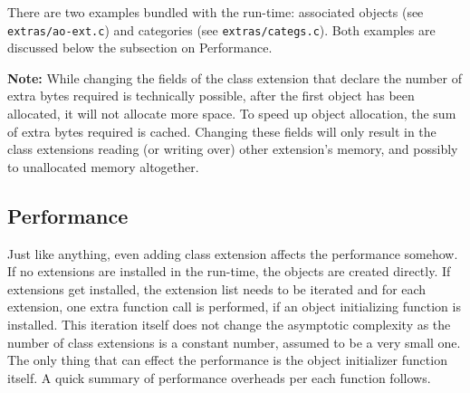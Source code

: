 There are two examples bundled with the run-time: associated objects (see \verb=extras/ao-ext.c=) and categories (see \texttt{extras/categs.c}). Both examples are discussed below the subsection on Performance.

\textbf{Note:} While changing the fields of the class extension that declare the number of extra bytes required is technically possible, after the first object has been allocated, it will not allocate more space. To speed up object allocation, the sum of extra bytes required is cached. Changing these fields will only result in the class extensions reading (or writing over) other extension's memory, and possibly to unallocated memory altogether.

\subsection{Performance}
Just like anything, even adding class extension affects the performance somehow. If no extensions are installed in the run-time, the objects are created directly. If extensions get installed, the extension list needs to be iterated and for each extension, one extra function call is performed, if an object initializing function is installed. This iteration itself does not change the asymptotic complexity as the number of class extensions is a constant number, assumed to be a very small one. The only thing that can effect the performance is the object initializer function itself. A quick summary of performance overheads per each function follows.

